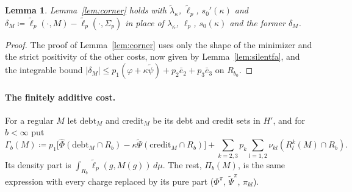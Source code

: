 \documentclass[11pt]{article}
\newtheorem{lemma}[theorem]{Lemma}
\theoremstyle{definition}\newtheorem{definition}[theorem]{Definition}
\theoremstyle{remark}\newtheorem{remark}[theorem]{Remark}
\newcommand{\debt}{\mathrm{debt}}
\newcommand{\cred}{\mathrm{credit}}
\newcommand{\Phihat}{\widehat\Phi}
\newcommand{\Psitil}{\widetilde\Psi}
\newcommand{\psitil}{\tilde\psi}
\begin{document}
\begin{lemma}\label{lem:cornerfa}
Lemma~\ref{lem:corner} holds with $\tilde\lambda_\kappa$, $\tilde\ell_p$,
$s_0'(\kappa)$ and $\delta_M\coloneqq\tilde\ell_p(\cdot,M)-\tilde\ell_p(\cdot,
\Sigma_p)$ in place of $\lambda_\kappa$, $\ell_p$, $s_0(\kappa)$ and the
former $\delta_M$.
\end{lemma}
\begin{proof}
The proof of Lemma~\ref{lem:corner} uses only the shape of the minimizer and
the strict positivity of the other costs, now given by
Lemma~\ref{lem:silentfa}, and the integrable bound
$|\delta_M|\le p_1(\varphi+\kappa\psitil)+p_2\bar e_2+p_3\bar e_3$ on $R_{b_0}$.
\end{proof}

\paragraph{The finitely additive cost.} For a regular $M$ let $\debt_M$ and
$\cred_M$ be its debt and credit sets in $H'$, and for $b<\infty$ put
\[
 \Gamma_b(M)\coloneqq p_1\bigl[\Phihat(\debt_M\cap R_b)-\kappa\Psitil(\cred_M
 \cap R_b)\bigr]+\sum_{k=2,3}p_k\sum_{l=1,2}\nu_{kl}(R^k_l(M)\cap R_b).
\]
Its density part is $\int_{R_b}\tilde\ell_p(g,M(g))\,d\mu$. The rest,
$\Pi_b(M)$, is the same expression with every charge replaced by its pure
part ($\Phi^\pi$, $\Psitil^\pi$, $\pi_{kl}$).
\end{document}
